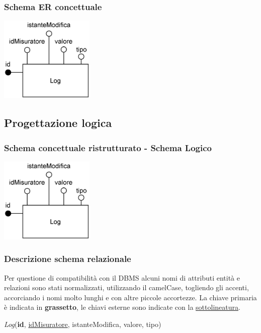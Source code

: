 \subsubsection{Schema ER concettuale}

\begin{center}
    \includegraphics[width=4.5cm]{contenuti/specifica-basi-dati/img-sbd/logging_concettuale.png}
\end{center}

\subsection{Progettazione logica}

\subsubsection{Schema concettuale ristrutturato - Schema Logico}

\begin{center}
    \includegraphics[width=4.5cm]{contenuti/specifica-basi-dati/img-sbd/logging_logico.png}
\end{center}

\subsubsection{Descrizione schema relazionale}

Per questione di compatibilità con il DBMS alcuni nomi di attributi entità e relazioni sono stati normalizzati, utilizzando il camelCase, togliendo gli accenti, accorciando i nomi molto lunghi e con altre piccole accortezze.
La chiave primaria è indicata in \textbf{grassetto}, le chiavi esterne sono indicate con la \underline{sottolineatura}.

\textit{Log}(\textbf{id}, \underline{idMisuratore}, istanteModifica, valore, tipo)
